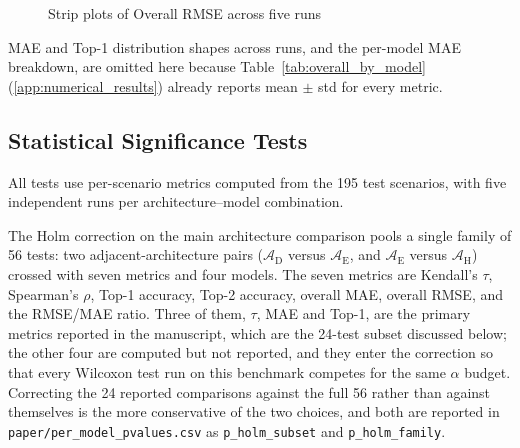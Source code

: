 \documentclass[11pt]{article}
\begin{document}
\begin{figure}[htbp]
\begin{minipage}{0.24\textwidth}
\begin{tikzpicture}
\end{tikzpicture}
\end{minipage}
\hfill
\begin{minipage}{0.24\textwidth}
\centering
{}
\end{minipage}
\caption{Strip plots of Overall RMSE across five runs}
\label{fig:violin_rmse}
\end{figure}

MAE and Top-1 distribution shapes across runs, and the per-model MAE breakdown, are omitted here because Table~\ref{tab:overall_by_model} (\ref{app:numerical_results}) already reports mean $\pm$ std for every metric.

\subsection{Statistical Significance Tests}
\label{app:significance}

All tests use per-scenario metrics computed from the 195 test scenarios, with five independent runs per architecture--model combination.

The Holm correction on the main architecture comparison pools a single family of 56 tests: two adjacent-architecture pairs ($\mathcal{A}_{\text{D}}$ versus $\mathcal{A}_{\text{E}}$, and $\mathcal{A}_{\text{E}}$ versus $\mathcal{A}_{\text{H}}$) crossed with seven metrics and four models. The seven metrics are Kendall's $\tau$, Spearman's $\rho$, Top-1 accuracy, Top-2 accuracy, overall MAE, overall RMSE, and the RMSE/MAE ratio. Three of them, $\tau$, MAE and Top-1, are the primary metrics reported in the manuscript, which are the 24-test subset discussed below; the other four are computed but not reported, and they enter the correction so that every Wilcoxon test run on this benchmark competes for the same $\alpha$ budget. Correcting the 24 reported comparisons against the full 56 rather than against themselves is the more conservative of the two choices, and both are reported in \texttt{paper/per\_model\_pvalues.csv} as \texttt{p\_holm\_subset} and \texttt{p\_holm\_family}.
\end{document}
